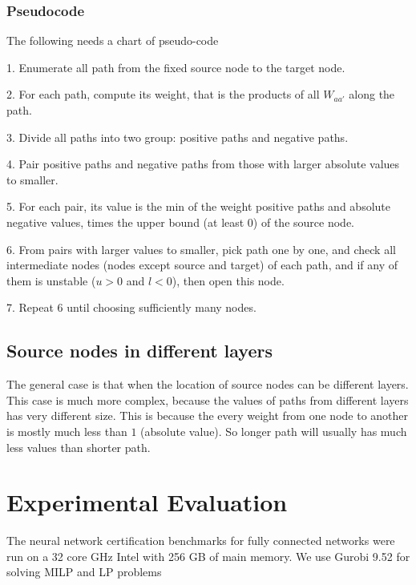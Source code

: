 \documentclass[8pt]{article}
\theoremstyle{definition}
\begin{document}
\subsubsection*{Pseudocode}

The following needs a chart of pseudo-code

\vspace*{1ex}

1. Enumerate all path from the fixed source node to the target node. 

2. For each path, compute its weight, that is the products of all $W_{aa'}$ along the path.

3. Divide all paths into two group: positive paths and negative paths.

4. Pair positive paths and negative paths from those with larger absolute values to smaller. 

5. For each pair, its value is the min of the weight positive paths and absolute negative values, times the upper bound (at least 0) of the source node.

6. From pairs with larger values to smaller, pick path one by one, and check all intermediate nodes (nodes except source and target) of each path, and if any of them is unstable ($u>0$ and $l<0$), then open this node. 

7. Repeat 6 until choosing sufficiently many nodes.







\subsection*{Source nodes in different layers}

The general case is that when the location of source nodes can be different layers. This case is much more complex, because the values of paths from different layers has very different size. This is because the every weight from one node to another is mostly much less than $1$ (absolute value). So longer path will usually has much less values than shorter path.


\section{Experimental Evaluation}

The neural network certification benchmarks for fully connected networks were run on a 32 core
GHz Intel with 256 GB of main memory. We use Gurobi 9.52 for solving MILP and LP problems
\end{document}
